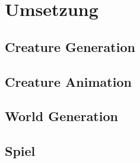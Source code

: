 \chapter{Umsetzung}
\label{Technische_Umsetzung}

\section{Creature Generation}


\section{Creature Animation}


\section{World Generation}


\section{Spiel}

